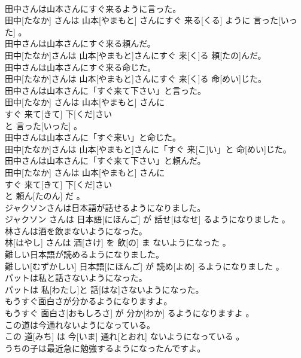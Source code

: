 \documentclass[8pt]{extreport}
\begin{document}
\begin{CJK}{UTF8}{min}
\\	田中さんは山本さんにすぐ来るように言った。	
\\	田中[たなか] さんは 山本[やまもと] さんにすぐ 来る[くる] ように 言った[いった] 。
\\	田中さんは山本さんにすぐ来る頼んだ。	
\\	田中[たなか]さんは 山本[やまもと]さんにすぐ 来[く]る 頼[たの]んだ。
\\	田中さんは山本さんにすぐ来る命じた。	
\\	田中[たなか]さんは 山本[やまもと]さんにすぐ 来[く]る 命[めい]じた。
\\	田中さんは山本さんに「すぐ来て下さい」と言った。	
\\	田中[たなか] さんは 山本[やまもと] さんに 
\\	すぐ 来て[きて] 下[くだ]さい 
\\	と 言った[いった] 。
\\	田中さんは山本さんに「すぐ来い」と命じた。	
\\	田中[たなか]さんは 山本[やまもと]さんに「すぐ 来[こ]い」と 命[めい]じた。
\\	田中さんは山本さんに「すぐ来て下さい」と頼んだ。	
\\	田中[たなか] さんは 山本[やまもと] さんに 
\\	すぐ 来て[きて] 下[くだ]さい 
\\	と 頼ん[たのん] だ 。
\\	ジャクソンさんは日本語が話せるようになりました。	
\\	ジャクソン さんは 日本語[にほんご] が 話せ[はなせ] るようになりました 。
\\	林さんは酒を飲まないようになった。	
\\	林[はやし] さんは 酒[さけ] を 飲[の] ま ないようになった 。
\\	難しい日本語が読めるようになりました。	
\\	難しい[むずかしい] 日本語[にほんご] が 読め[よめ] るようになりました 。
\\	パットは私と話さないようになった。	
\\	パットは 私[わたし]と 話[はな]さないようになった。
\\	もうすぐ面白さが分かるようになりますよ。	
\\	もうすぐ 面白さ[おもしろさ] が 分か[わか] るようになりますよ 。
\\	この道は今通れないようになっている。	
\\	この 道[みち] は 今[いま] 通れ[とおれ] ないようになっている 。
\\	うちの子は最近急に勉強するようになったんですよ。	

\end{CJK}
\end{document}
